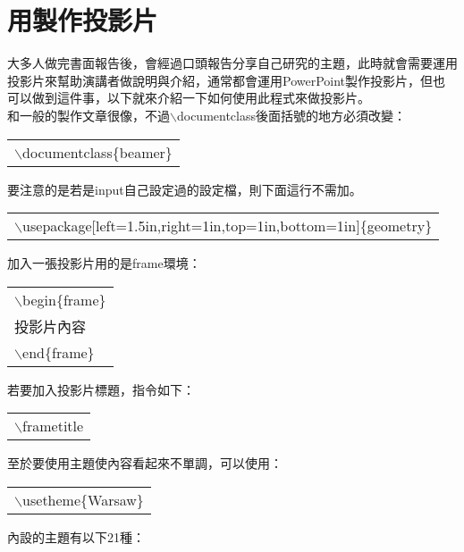 \section{{用\XeLaTeX  製作投影片}}
大多人做完書面報告後，會經過口頭報告分享自己研究的主題，此時就會需要運用投影片來幫助演講者做說明與介紹，通常都會運用PowerPoint製作投影片，但\XeLaTeX 也可以做到這件事，以下就來介紹一下如何使用此程式來做投影片。\\
和一般的製作文章很像，不過$\backslash$documentclass後面括號的地方必須改變：
\begin{center}\colorbox{slight}{\begin{tabular}{p{}}
	{$\backslash$documentclass\{beamer\}}
\end{tabular}}
\end{center}
要注意的是若是input自己設定過的設定檔，則下面這行不需加。
\begin{center}\colorbox{slight}{\begin{tabular}{p{}}
	{$\backslash$usepackage[left=1.5in,right=1in,top=1in,bottom=1in]\{geometry\} }
\end{tabular}}
\end{center}
加入一張投影片用的是frame環境：
\begin{center}\colorbox{slight}{\begin{tabular}{p{}}
	$\backslash$begin\{frame\}\\
	投影片內容\\
	$\backslash$end\{frame\}\\
\end{tabular}}
\end{center}
若要加入投影片標題，指令如下：
	\begin{center}\colorbox{slight}{\begin{tabular}{p{}}
	{$\backslash$frametitle}
\end{tabular}}
\end{center}
至於要使用主題使內容看起來不單調，可以使用：
\begin{center}\colorbox{slight}{\begin{tabular}{p{}}
	{$\backslash$usetheme\{Warsaw\}}
\end{tabular}}
\end{center}
內設的主題有以下21種：
